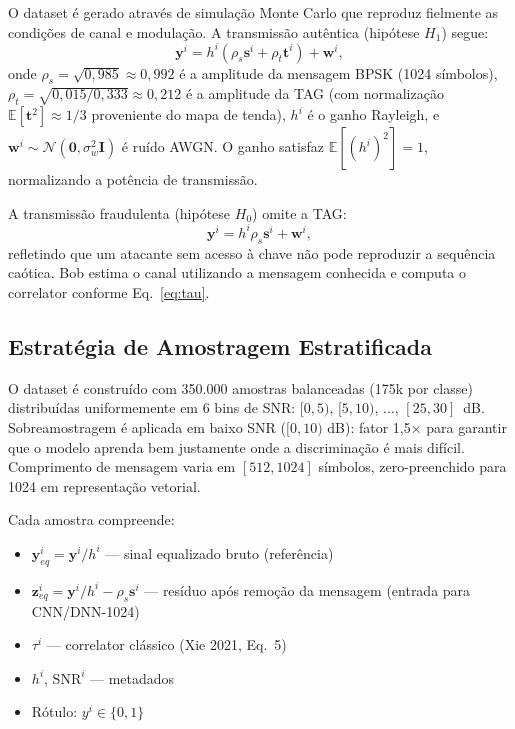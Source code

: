\documentclass[12pt,a4paper]{article}
\begin{document}
O dataset é gerado através de simulação Monte Carlo que reproduz fielmente as condições de canal e modulação. A transmissão autêntica (hipótese $H_1$) segue:
\begin{equation}\label{eq:sig_h1}
\mathbf{y}^i = h^i \left( \rho_s \mathbf{s}^i + \rho_t \mathbf{t}^i \right) + \mathbf{w}^i,
\end{equation}
onde $\rho_s = \sqrt{0{,}985} \approx 0{,}992$ é a amplitude da mensagem BPSK (1024 símbolos), $\rho_t = \sqrt{0{,}015 / 0{,}333} \approx 0{,}212$ é a amplitude da TAG (com normalização $\mathbb{E}[\mathbf{t}^2] \approx 1/3$ proveniente do mapa de tenda), $h^i$ é o ganho Rayleigh, e $\mathbf{w}^i \sim \mathcal{N}(\mathbf{0}, \sigma_w^2 \mathbf{I})$ é ruído AWGN. O ganho satisfaz $\mathbb{E}[(h^i)^2] = 1$, normalizando a potência de transmissão.

A transmissão fraudulenta (hipótese $H_0$) omite a TAG:
\begin{equation}\label{eq:sig_h0}
\mathbf{y}^i = h^i \rho_s \mathbf{s}^i + \mathbf{w}^i,
\end{equation}
refletindo que um atacante sem acesso à chave não pode reproduzir a sequência caótica. Bob estima o canal utilizando a mensagem conhecida e computa o correlator conforme Eq.~\ref{eq:tau}.

\subsection{Estratégia de Amostragem Estratificada}

O dataset é construído com 350.000 amostras balanceadas (175k por classe) distribuídas uniformemente em 6 bins de SNR: $[0,5)$, $[5,10)$, $\ldots$, $[25,30]$~dB. Sobreamostragem é aplicada em baixo SNR ($[0,10)$ dB): fator 1,5× para garantir que o modelo aprenda bem justamente onde a discriminação é mais difícil. Comprimento de mensagem varia em $[512, 1024]$ símbolos, zero-preenchido para 1024 em representação vetorial.

Cada amostra compreende:
\begin{itemize}
  \item $\mathbf{y}_{eq}^i = \mathbf{y}^i / h^i$ — sinal equalizado bruto (referência)
  \item $\mathbf{z}_{eq}^i = \mathbf{y}^i / h^i - \rho_s \mathbf{s}^i$ — resíduo após remoção da mensagem (entrada para CNN/DNN-1024)
  \item $\tau^i$ — correlator clássico (Xie 2021, Eq.~5)
  \item $h^i$, $\text{SNR}^i$ — metadados
  \item Rótulo: $y^i \in \{0, 1\}$
\end{itemize}
\end{document}
